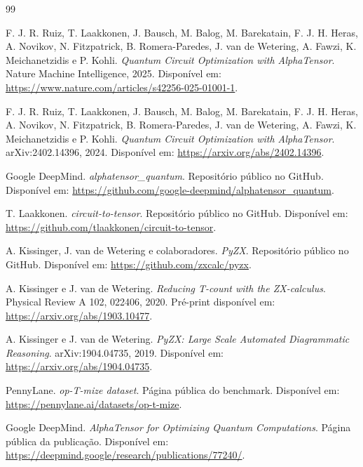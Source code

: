 \documentclass[a4paper,11pt]{article}
\begin{document}
\begin{thebibliography}{99}

F. J. R. Ruiz, T. Laakkonen, J. Bausch, M. Balog, M. Barekatain, F. J. H. Heras, A. Novikov, N. Fitzpatrick, B. Romera-Paredes, J. van de Wetering, A. Fawzi, K. Meichanetzidis e P. Kohli.
\newblock \emph{Quantum Circuit Optimization with AlphaTensor}.
\newblock Nature Machine Intelligence, 2025.
\newblock Disponível em: \url{https://www.nature.com/articles/s42256-025-01001-1}.

F. J. R. Ruiz, T. Laakkonen, J. Bausch, M. Balog, M. Barekatain, F. J. H. Heras, A. Novikov, N. Fitzpatrick, B. Romera-Paredes, J. van de Wetering, A. Fawzi, K. Meichanetzidis e P. Kohli.
\newblock \emph{Quantum Circuit Optimization with AlphaTensor}.
\newblock arXiv:2402.14396, 2024.
\newblock Disponível em: \url{https://arxiv.org/abs/2402.14396}.

Google DeepMind.
\newblock \emph{alphatensor\_quantum}.
\newblock Repositório público no GitHub.
\newblock Disponível em: \url{https://github.com/google-deepmind/alphatensor_quantum}.

T. Laakkonen.
\newblock \emph{circuit-to-tensor}.
\newblock Repositório público no GitHub.
\newblock Disponível em: \url{https://github.com/tlaakkonen/circuit-to-tensor}.

A. Kissinger, J. van de Wetering e colaboradores.
\newblock \emph{PyZX}.
\newblock Repositório público no GitHub.
\newblock Disponível em: \url{https://github.com/zxcalc/pyzx}.

A. Kissinger e J. van de Wetering.
\newblock \emph{Reducing T-count with the ZX-calculus}.
\newblock Physical Review A 102, 022406, 2020.
\newblock Pré-print disponível em: \url{https://arxiv.org/abs/1903.10477}.

A. Kissinger e J. van de Wetering.
\newblock \emph{PyZX: Large Scale Automated Diagrammatic Reasoning}.
\newblock arXiv:1904.04735, 2019.
\newblock Disponível em: \url{https://arxiv.org/abs/1904.04735}.

PennyLane.
\newblock \emph{op-T-mize dataset}.
\newblock Página pública do benchmark.
\newblock Disponível em: \url{https://pennylane.ai/datasets/op-t-mize}.

Google DeepMind.
\newblock \emph{AlphaTensor for Optimizing Quantum Computations}.
\newblock Página pública da publicação.
\newblock Disponível em: \url{https://deepmind.google/research/publications/77240/}.

\end{thebibliography}
\end{document}
